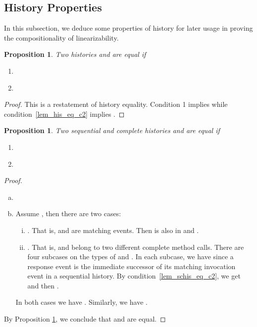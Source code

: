 \documentclass[a4paper,USenglish]{lipics-v2016}
\newtheorem{prop}[theorem]{Proposition}
\begin{document}
\subsection{History Properties}\label{sec:hisproperty}
In this subsection, we deduce some properties of history for later usage in proving the compositionality of
linearizability.

\begin{prop}\label{lem_his_eq}
	Two histories  and  are equal if
	\begin{enumerate}[(1)]
		\item 
		\item\label{lem_his_eq_c2} 
	\end{enumerate}
\end{prop}
\begin{proof}
	This is a restatement of history equality.
	Condition 1 implies  while condition~\ref{lem_his_eq_c2} implies .
\end{proof}

\begin{prop}\label{lem_schis_eq}
	Two sequential and complete histories  and  are equal if
	\begin{enumerate}[(1)]
		\item\label{lem_schis_eq_c1}
		
		\item\label{lem_schis_eq_c2}
		
	\end{enumerate}
\end{prop}
\begin{proof}
	\begin{enumerate}[(a)]
		\item
		
		
		\item
		Assume , then there are two cases:
		\begin{enumerate}[(i)]
			\item
			. That is,  and  are matching events. Then  is also in  and .
			\item
			. That is,  and  belong to two different complete method calls.
			There are four subcases on the types of  and . In each subcase, we have 
			since a response event is the immediate successor of its matching invocation event in a sequential history.
			By condition~\ref{lem_schis_eq_c2}, we get  and then .
		\end{enumerate}	
		In both cases we have .
		Similarly, we have .
	\end{enumerate}
	By Proposition \ref{lem_his_eq}, we conclude that  and  are equal.
\end{proof}
\end{document}
